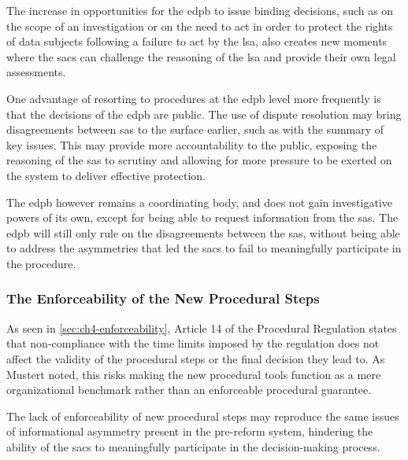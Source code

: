 The increase in opportunities for the \gls{edpb} to issue binding decisions, such as on the scope of an investigation or on the need to act in order to protect the rights of data subjects following a failure to act by the \gls{lsa}, also creates new moments where the \glspl{sac} can challenge the reasoning of the \gls{lsa} and provide their own legal assessments.\autocite[11(6), 12(5)]{ProceduralRegulation}

One advantage of resorting to procedures at the \gls{edpb} level more frequently is that the decisions of the \gls{edpb} are public.\autocite[39]{EDPBRulesofProcedure}
The use of dispute resolution may bring disagreements between \glspl{sa} to the surface earlier, such as with the summary of key issues.
This may provide more accountability to the public, exposing the reasoning of the \glspl{sa} to scrutiny and allowing for more pressure to be exerted on the system to deliver effective protection.\autocite[1702]{liShoulderEnforcementEuropean2022}

The \gls{edpb} however remains a coordinating body, and does not gain investigative powers of its own, except for being able to request information from the \glspl{sa}.\autocites[27(4)]{ProceduralRegulation}[25]{klozaIfItAint2026}
The \gls{edpb} will still only rule on the disagreements between the \glspl{sa}, without being able to address the asymmetries that led the \glspl{sac} to fail to meaningfully participate in the procedure.

\subsubsection{The Enforceability of the New Procedural Steps}
\label{sec:ch5-enforceability}

As seen in \cref{sec:ch4-enforceability}, Article 14 of the Procedural Regulation states that non-compliance with the time limits imposed by the regulation does not affect the validity of the procedural steps or the final decision they lead to.\autocite[14]{ProceduralRegulation}
As Mustert noted, this risks making the new procedural tools function as a mere organizational benchmark rather than an enforceable procedural guarantee.\autocite[507]{mustertProceduralisingEnforcement2026}

The lack of enforceability of new procedural steps may reproduce the same issues of informational asymmetry present in the pre-reform system, hindering the ability of the \glspl{sac} to meaningfully participate in the decision-making process.

